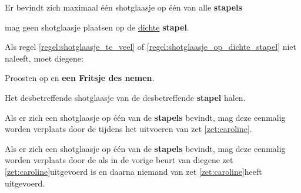
\newpage
{}


\vervolgLijst{}
\item \label{regel:caroline_een_shotglaasje} Er bevindt zich maximaal \'e\'en shotglaasje op \'e\'en van alle \textbf{stapels}
\label{regel:shotglaasje_te_veel}
\eindLijst{}

\vervolgLijst{}
\item \label{regel:caroline_onjuist_plaatsen_1} \EenSpeler mag geen shotglaasje plaatsen op de \ul{dichte} \textbf{stapel}.
\label{regel:shotglaasje_op_dichte_stapel}
\eindLijst{}


\vervolgLijst{}
\item Als \eenSpeler regel \ref{regel:shotglaasje_te_veel} of \ref{regel:shotglaasje_op_dichte_stapel} niet naleeft, moet diegene:
\puntLijst{}
\item Proosten op  en \textbf{een Fritsje des nemen}\footnotemark[1].
\item Het desbetreffende shotglaasje van de desbetreffende \textbf{stapel} halen.
\eindPuntLijst{}
\eindLijst{}



\vervolgLijst{}
\item \label{regel:shotglaasje_aanraken_1} Als er zich een shotglaasje op \'e\'en van de \textbf{stapels} bevindt, mag deze eenmalig worden verplaats door de \huidigeSpeler tijdens het uitvoeren van zet \ref{zet:caroline}\footnotemark[2].
\eindLijst{}

\vervolgLijst{}
\item \label{regel:shotglaasje_aanraken_2} Als er zich een shotglaasje op \'e\'en van de \textbf{stapels} bevindt, mag deze eenmalig worden verplaats door de \huidigeSpeler als in de vorige beurt van diegene zet \ref{zet:caroline}\footnotemark[2] uitgevoerd is en daarna niemand van \alleSpelers zet \ref{zet:caroline}\footnotemark[2] heeft uitgevoerd.
\eindLijst{}


